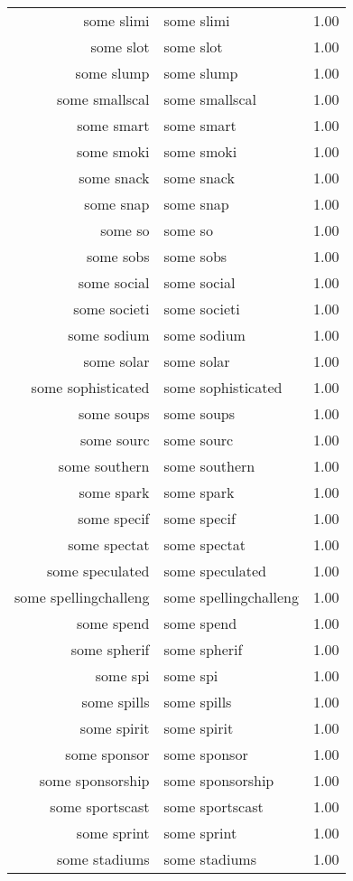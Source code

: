 \begin{table}[ht]
\begin{tabular}{rlr}
  some slimi & some slimi & 1.00 \\ 
  some slot & some slot & 1.00 \\ 
  some slump & some slump & 1.00 \\ 
  some smallscal & some smallscal & 1.00 \\ 
  some smart & some smart & 1.00 \\ 
  some smoki & some smoki & 1.00 \\ 
  some snack & some snack & 1.00 \\ 
  some snap & some snap & 1.00 \\ 
  some so & some so & 1.00 \\ 
  some sobs & some sobs & 1.00 \\ 
  some social & some social & 1.00 \\ 
  some societi & some societi & 1.00 \\ 
  some sodium & some sodium & 1.00 \\ 
  some solar & some solar & 1.00 \\ 
  some sophisticated & some sophisticated & 1.00 \\ 
  some soups & some soups & 1.00 \\ 
  some sourc & some sourc & 1.00 \\ 
  some southern & some southern & 1.00 \\ 
  some spark & some spark & 1.00 \\ 
  some specif & some specif & 1.00 \\ 
  some spectat & some spectat & 1.00 \\ 
  some speculated & some speculated & 1.00 \\ 
  some spellingchalleng & some spellingchalleng & 1.00 \\ 
  some spend & some spend & 1.00 \\ 
  some spherif & some spherif & 1.00 \\ 
  some spi & some spi & 1.00 \\ 
  some spills & some spills & 1.00 \\ 
  some spirit & some spirit & 1.00 \\ 
  some sponsor & some sponsor & 1.00 \\ 
  some sponsorship & some sponsorship & 1.00 \\ 
  some sportscast & some sportscast & 1.00 \\ 
  some sprint & some sprint & 1.00 \\ 
  some stadiums & some stadiums & 1.00 \\ 

\end{tabular}
\end{table}
